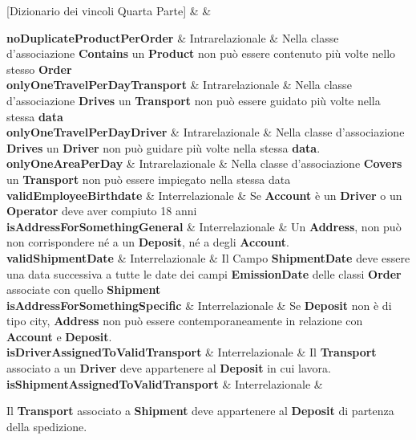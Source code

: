 [Dizionario dei vincoli Quarta Parte]{ &  & }{
  
  \textbf{noDuplicateProductPerOrder} & Intrarelazionale &
  {\footnotesize
  Nella classe d'associazione \textbf{Contains} un \textbf{Product} non può essere contenuto più volte nello stesso \textbf{Order}
  }\\

  \textbf{onlyOneTravelPerDayTransport} & Intrarelazionale & 
  {\footnotesize
  Nella classe d’associazione \textbf{Drives} un \textbf{Transport} non può essere guidato più volte nella stessa \textbf{data}
  }\\

  \textbf{onlyOneTravelPerDayDriver} & Intrarelazionale &
  {\footnotesize
  Nella classe d’associazione \textbf{Drives} un \textbf{Driver} non può guidare più volte nella stessa \textbf{data}.
  }\\

  \textbf{onlyOneAreaPerDay} & Intrarelazionale & 
  {\footnotesize    
  Nella classe d’associazione \textbf{Covers} un \textbf{Transport} non può essere impiegato nella stessa data
  }\\

  \textbf{validEmployeeBirthdate} & Interrelazionale &
  {\footnotesize
  Se \textbf{Account} è un \textbf{Driver} o un \textbf{Operator} deve aver compiuto 18 anni
  }\\

  \textbf{isAddressForSomethingGeneral}\label{isAddressForSomethingGeneral} & Interrelazionale &
  {\footnotesize
  Un \textbf{Address}, non può non corrispondere né a un \textbf{Deposit}, né a degli \textbf{Account}.
  }\\

  \textbf{validShipmentDate} & Interrelazionale & 
  {\footnotesize
  Il Campo \textbf{ShipmentDate} deve essere una data successiva a tutte le date dei campi \textbf{EmissionDate} delle classi \textbf{Order} associate con quello \textbf{Shipment}
  }\\

  \textbf{isAddressForSomethingSpecific} & Interrelazionale &
  {\footnotesize
  Se \textbf{Deposit} non è di tipo city, \textbf{Address} non può essere contemporaneamente in relazione con \textbf{Account} e \textbf{Deposit}. 
  }\\

  \textbf{isDriverAssignedToValidTransport} & Interrelazionale &
  {\footnotesize
  Il \textbf{Transport} associato a un \textbf{Driver} deve appartenere al \textbf{Deposit} in cui lavora.
  }\\

  \textbf{isShipmentAssignedToValidTransport} & Interrelazionale &
  {\footnotesize

  Il \textbf{Transport } associato a \textbf{Shipment} deve appartenere al \textbf{Deposit} di partenza della spedizione.
  }\\
}

